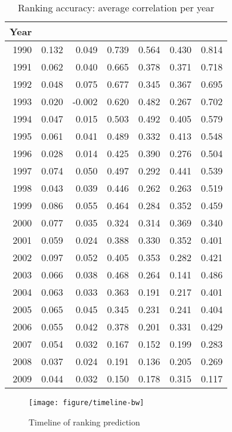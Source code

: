 \begin{table}[hp]
\caption{Ranking accuracy: average correlation per year}
\label{stat:acc:time}
\begin{center}
\begin{tabular}{rrrrrrr}
  \toprule
 Year & \naive{} & {} & \raw{} & \diff{} & \random{} & \rollsd{} \\ 
  \midrule
1990 & 0.132 & 0.049 & 0.739 & 0.564 & 0.430 & 0.814 \\ 
  1991 & 0.062 & 0.040 & 0.665 & 0.378 & 0.371 & 0.718 \\ 
  1992 & 0.048 & 0.075 & 0.677 & 0.345 & 0.367 & 0.695 \\ 
  1993 & 0.020 & -0.002 & 0.620 & 0.482 & 0.267 & 0.702 \\ 
  1994 & 0.047 & 0.015 & 0.503 & 0.492 & 0.405 & 0.579 \\ 
  1995 & 0.061 & 0.041 & 0.489 & 0.332 & 0.413 & 0.548 \\ 
  1996 & 0.028 & 0.014 & 0.425 & 0.390 & 0.276 & 0.504 \\ 
  1997 & 0.074 & 0.050 & 0.497 & 0.292 & 0.441 & 0.539 \\ 
  1998 & 0.043 & 0.039 & 0.446 & 0.262 & 0.263 & 0.519 \\ 
  1999 & 0.086 & 0.055 & 0.464 & 0.284 & 0.352 & 0.459 \\ 
  2000 & 0.077 & 0.035 & 0.324 & 0.314 & 0.369 & 0.340 \\ 
  2001 & 0.059 & 0.024 & 0.388 & 0.330 & 0.352 & 0.401 \\ 
  2002 & 0.097 & 0.052 & 0.405 & 0.353 & 0.282 & 0.421 \\ 
  2003 & 0.066 & 0.038 & 0.468 & 0.264 & 0.141 & 0.486 \\ 
  2004 & 0.063 & 0.033 & 0.363 & 0.191 & 0.217 & 0.401 \\ 
  2005 & 0.065 & 0.045 & 0.345 & 0.231 & 0.241 & 0.404 \\ 
  2006 & 0.055 & 0.042 & 0.378 & 0.201 & 0.331 & 0.429 \\ 
  2007 & 0.054 & 0.032 & 0.167 & 0.152 & 0.199 & 0.283 \\ 
  2008 & 0.037 & 0.024 & 0.191 & 0.136 & 0.205 & 0.269 \\ 
  2009 & 0.044 & 0.032 & 0.150 & 0.178 & 0.315 & 0.117 \\ 
   \bottomrule
\end{tabular}
\end{center}
\end{table}

\begin{figure}[hp]
\texttt{[image: figure/timeline-bw]}
 \caption{Timeline of ranking prediction} 
\label{fig: timeline} 
\end{figure}



%

